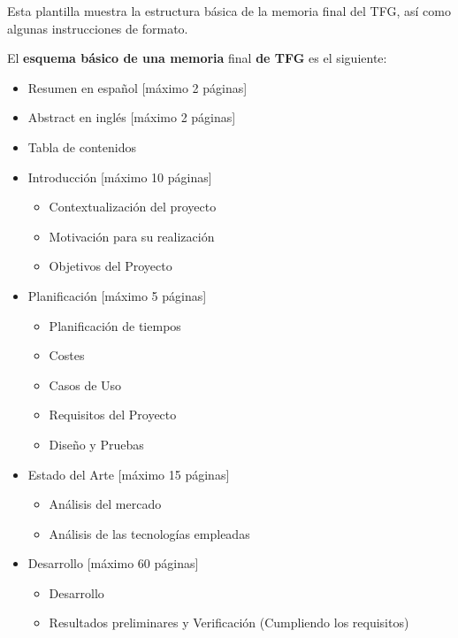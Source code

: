 \iffalse

Esta plantilla muestra la estructura básica de la memoria final del TFG, así como algunas instrucciones de formato.

El \textbf{esquema básico de una memoria} final \textbf{de TFG} es el siguiente:
\begin{itemize}
\item[•] Resumen en español [máximo 2 páginas]
\item[•] Abstract en inglés [máximo 2 páginas]
\item[•] Tabla de contenidos
\item[•] Introducción [máximo 10 páginas]
\begin{itemize}
    \item Contextualización del proyecto
    \item Motivación para su realización
\end{itemize}
\begin{itemize}
    \item Objetivos del Proyecto
\end{itemize}
\item[•]   Planificación [máximo 5 páginas]
\begin{itemize}
    \item Planificación de tiempos
    \item Costes
\end{itemize}
\begin{itemize}
    \item Casos de Uso
    \item Requisitos del Proyecto
    \item Diseño y Pruebas
\end{itemize}
\item[•] Estado del Arte [máximo 15 páginas]
\begin{itemize}
    \item Análisis del mercado
    \item Análisis de las tecnologías empleadas
\end{itemize}
\item[•] Desarrollo [máximo 60 páginas]
\begin{itemize}
    \item Desarrollo
    \item Resultados preliminares y Verificación (Cumpliendo los requisitos)

\end{itemize}
\end{itemize}
